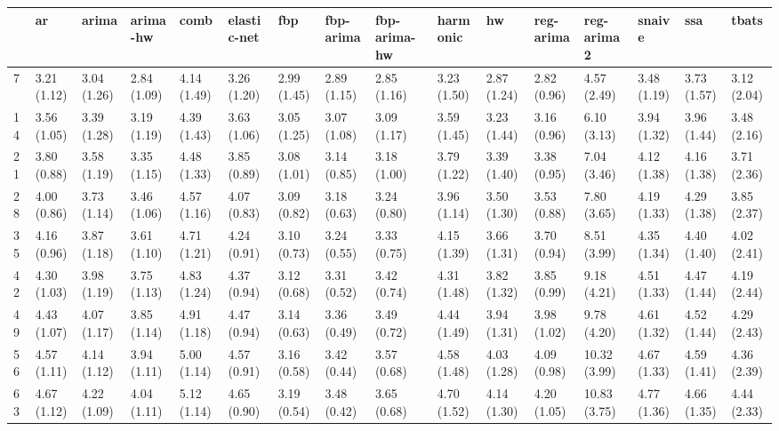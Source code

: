 \begin{tabular}{llllllllllllllll}
\toprule
{} &           ar &        arima &     arima-hw &         comb &  elastic-net &          fbp &    fbp-arima & fbp-arima-hw &     harmonic &           hw &    reg-arima &    reg-arima2 &       snaive &          ssa &        tbats \\
\midrule
7   &  3.21 (1.12) &  3.04 (1.26) &  2.84 (1.09) &  4.14 (1.49) &  3.26 (1.20) &  2.99 (1.45) &  2.89 (1.15) &  2.85 (1.16) &  3.23 (1.50) &  2.87 (1.24) &  2.82 (0.96) &   4.57 (2.49) &  3.48 (1.19) &  3.73 (1.57) &  3.12 (2.04) \\
14  &  3.56 (1.05) &  3.39 (1.28) &  3.19 (1.19) &  4.39 (1.43) &  3.63 (1.06) &  3.05 (1.25) &  3.07 (1.08) &  3.09 (1.17) &  3.59 (1.45) &  3.23 (1.44) &  3.16 (0.96) &   6.10 (3.13) &  3.94 (1.32) &  3.96 (1.44) &  3.48 (2.16) \\
21  &  3.80 (0.88) &  3.58 (1.19) &  3.35 (1.15) &  4.48 (1.33) &  3.85 (0.89) &  3.08 (1.01) &  3.14 (0.85) &  3.18 (1.00) &  3.79 (1.22) &  3.39 (1.40) &  3.38 (0.95) &   7.04 (3.46) &  4.12 (1.38) &  4.16 (1.38) &  3.71 (2.36) \\
28  &  4.00 (0.86) &  3.73 (1.14) &  3.46 (1.06) &  4.57 (1.16) &  4.07 (0.83) &  3.09 (0.82) &  3.18 (0.63) &  3.24 (0.80) &  3.96 (1.14) &  3.50 (1.30) &  3.53 (0.88) &   7.80 (3.65) &  4.19 (1.33) &  4.29 (1.38) &  3.85 (2.37) \\
35  &  4.16 (0.96) &  3.87 (1.18) &  3.61 (1.10) &  4.71 (1.21) &  4.24 (0.91) &  3.10 (0.73) &  3.24 (0.55) &  3.33 (0.75) &  4.15 (1.39) &  3.66 (1.31) &  3.70 (0.94) &   8.51 (3.99) &  4.35 (1.34) &  4.40 (1.40) &  4.02 (2.41) \\
42  &  4.30 (1.03) &  3.98 (1.19) &  3.75 (1.13) &  4.83 (1.24) &  4.37 (0.94) &  3.12 (0.68) &  3.31 (0.52) &  3.42 (0.74) &  4.31 (1.48) &  3.82 (1.32) &  3.85 (0.99) &   9.18 (4.21) &  4.51 (1.33) &  4.47 (1.44) &  4.19 (2.44) \\
49  &  4.43 (1.07) &  4.07 (1.17) &  3.85 (1.14) &  4.91 (1.18) &  4.47 (0.94) &  3.14 (0.63) &  3.36 (0.49) &  3.49 (0.72) &  4.44 (1.49) &  3.94 (1.31) &  3.98 (1.02) &   9.78 (4.20) &  4.61 (1.32) &  4.52 (1.44) &  4.29 (2.43) \\
56  &  4.57 (1.11) &  4.14 (1.12) &  3.94 (1.11) &  5.00 (1.14) &  4.57 (0.91) &  3.16 (0.58) &  3.42 (0.44) &  3.57 (0.68) &  4.58 (1.48) &  4.03 (1.28) &  4.09 (0.98) &  10.32 (3.99) &  4.67 (1.33) &  4.59 (1.41) &  4.36 (2.39) \\
63  &  4.67 (1.12) &  4.22 (1.09) &  4.04 (1.11) &  5.12 (1.14) &  4.65 (0.90) &  3.19 (0.54) &  3.48 (0.42) &  3.65 (0.68) &  4.70 (1.52) &  4.14 (1.30) &  4.20 (1.05) &  10.83 (3.75) &  4.77 (1.36) &  4.66 (1.35) &  4.44 (2.33) \\

\end{tabular}
